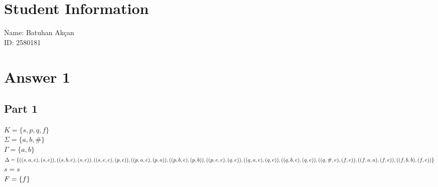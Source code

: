 \documentclass{article}
\begin{document}
\section*{Student Information}
Name: Batuhan Akçan \\
ID: 2580181 \\

\section*{Answer 1}
\subsection*{Part 1}
$K = \{s,p,q,f\}$\\
$\Sigma = \{a,b,\#\}$\\
$ \Gamma = \{a,b\} $\\
$\Delta = \{((s,a,e),(s,e)),\\
			((s,b,e),(s,e)),\\
			((s,e,e),(p,e)),\\
			((p,a,e),(p,a)),\\
			((p,b,e),(p,b)),\\
			((p,e,e),(q,e)),\\
			((q,a,e),(q,e)),\\
			((q,b,e),(q,e)),\\
			((q,\#,e),(f,e)),\\
			((f,a,a),(f,e)),\\
			((f,b,b),(f,e))\} $\vspace{0.1cm}\\
$s = s$\\
$F = \{f\}\vspace{0.3cm}$\\
\end{document}
